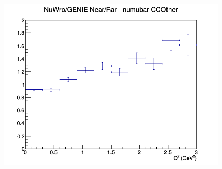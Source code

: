 \documentclass[12pt]{article}
\begin{document}
\begin{figure}[h]
\endminipage
{}
\includegraphics[width=\linewidth]{eff_Q2/LAr/ratios/CCOther_NuWro_GENIE_numubar_NF_Q2.png}
\endminipage
\newline
\end{figure}
\clearpage
\end{document}
